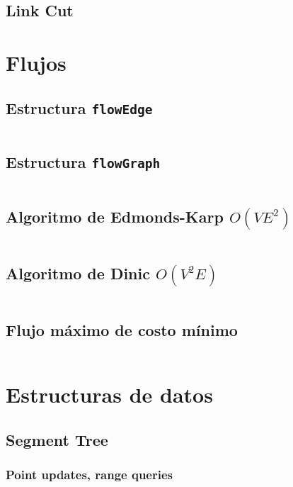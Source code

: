 \documentclass[11pt]{article}
\begin{document}
		
		\subsection{Link Cut}
		
		
	\newpage
	\section{Flujos}
		\subsection{Estructura \texttt{flowEdge}}
		\inputminted[tabsize=2,breaklines,firstline=4,lastline=17,fontsize=\small]{c++}{flow.cpp}
		
		\subsection{Estructura \texttt{flowGraph}}
		\inputminted[tabsize=2,breaklines,firstline=19,lastline=38,fontsize=\small]{c++}{flow.cpp}
		
		\subsection{Algoritmo de Edmonds-Karp $O(VE^2)$}
		\inputminted[tabsize=2,breaklines,firstline=82,lastline=108,fontsize=\small]{c++}{flow.cpp}
		
		\subsection{Algoritmo de Dinic $O(V^2E)$}
		\inputminted[tabsize=2,breaklines,firstline=40,lastline=80,fontsize=\small]{c++}{flow.cpp}
		
		\subsection{Flujo máximo de costo mínimo}
		\inputminted[tabsize=2,breaklines,firstline=110,lastline=145,fontsize=\small]{c++}{flow.cpp}
		
	\newpage
	\section{Estructuras de datos}
		\subsection{Segment Tree}
			\subsubsection{Point updates, range queries}
			\inputminted[tabsize=2,breaklines,firstline=4,lastline=37,fontsize=\small]{c++}{queries.cpp}
			
\end{document}
